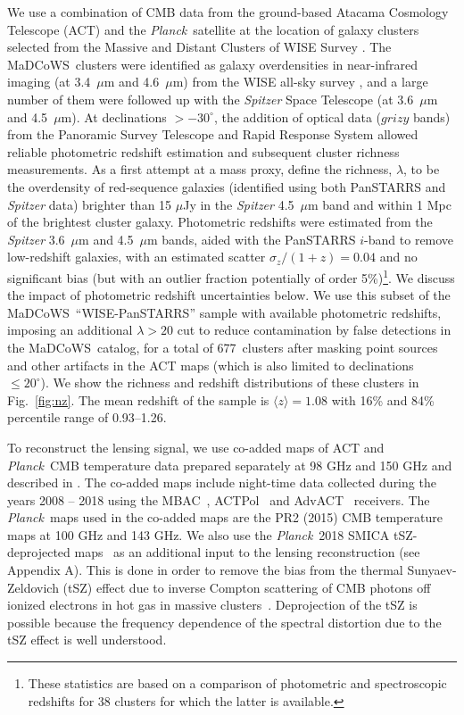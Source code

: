 \documentclass[preprint2]{aastex63}
\newcommand{\meanz}{1.08}
\newcommand{\nclusters}{677~}
\newcommand{\madcows}{MaDCoWS}
\newcommand{\Planck}{{\it Planck}}
\newcommand{\observable}{\lambda}
\begin{document}
We use a combination of CMB data from the ground-based Atacama Cosmology Telescope (ACT) and the \Planck\ satellite at the location of galaxy clusters selected from the Massive and Distant Clusters of WISE Survey \citep[\madcows,][]{gonzalez19}.
The \madcows\ clusters were identified as galaxy overdensities in near-infrared imaging (at 3.4~$\mu$m and 4.6~$\mu$m) from the WISE all-sky survey \citep{WISE2010}, and a large number of them were followed up with the \textit{Spitzer} Space Telescope (at 3.6~$\mu$m and 4.5~$\mu$m).
At declinations $>-30^\circ$, the addition of optical data ($grizy$ bands) from the Panoramic Survey Telescope and Rapid Response System \citep[Pan-STARRS,][]{panstarrs} allowed reliable photometric redshift estimation and subsequent cluster richness measurements.
As a first attempt at a mass proxy, \citet{gonzalez19} define the richness, $\observable$, to be the overdensity of red-sequence galaxies (identified using both PanSTARRS and \textit{Spitzer} data) brighter than 15 $\mu$Jy in the \textit{Spitzer} 4.5~$\mu$m band and within 1 Mpc of the brightest cluster galaxy.
Photometric redshifts were estimated from the \textit{Spitzer} 3.6~$\mu$m and 4.5~$\mu$m bands, aided with the PanSTARRS $i$-band to remove low-redshift galaxies, with an estimated scatter $\sigma_z/(1+z)=0.04$ and no significant bias (but with an outlier fraction potentially of order 5\%)\footnote{These statistics are based on a comparison of photometric and spectroscopic redshifts for 38 clusters for which the latter is available.}.
We discuss the impact of photometric redshift uncertainties below.
We use this subset of the \madcows\ ``WISE-PanSTARRS'' sample with available photometric redshifts, imposing an additional $\observable>20$ cut to reduce contamination by false detections in the \madcows\ catalog, for a total of \nclusters clusters after masking point sources and other artifacts in the ACT maps (which is also limited to declinations \ $\leq20^\circ$). 
We show the richness and redshift distributions of these clusters in Fig.\ \ref{fig:nz}. The mean redshift of the sample is $\langle z\rangle=\meanz$ with 
16\% and 84\% percentile range of 0.93--1.26.


To reconstruct the lensing signal, we use co-added maps of ACT and \Planck\ CMB temperature data prepared separately at 98 GHz and 150 GHz and described in \cite{2007.07290}. The co-added maps include night-time data collected during the years 2008 -- 2018 using the MBAC~\citep{Swetz2011}, ACTPol~\citep{thornton/2016} and AdvACT~\citep{Henderson2016} receivers. The \Planck\ maps used in the co-added maps are the PR2 (2015) CMB temperature maps at 100 GHz and 143 GHz. We also use the \Planck\ 2018 SMICA tSZ-deprojected maps~\citep{Planck2018compsep} as an additional input to the lensing reconstruction (see Appendix A). This is done in order to remove the bias from the thermal Sunyaev-Zeldovich (tSZ) effect due to inverse Compton scattering of CMB photons off ionized electrons in hot gas in massive clusters~\citep{1802.08230}.  Deprojection of the tSZ is possible because the frequency dependence of the spectral distortion due to the tSZ effect is well understood.
\end{document}
